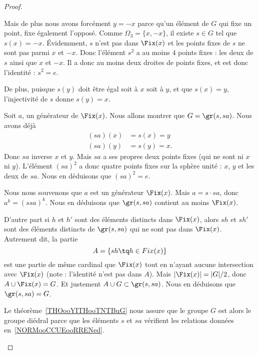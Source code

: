 \begin{proof}
\begin{subproof}
		Mais de plus nous avons forcément \( y=-x\) parce qu'un élément de \( G\) qui fixe un point, fixe également l'opposé. Comme \( \Omega_3=\{ x,-x \}\), il existe \( s\in G\) tel que \( s(x)=-x\). Évidemment, \( s\) n'est pas dans \( \Fix(x)\) et les points fixes de \( s\) ne sont pas parmi \( x\) et \( -x\). Donc l'élément \( s^2\) a au moins \( 4\) points fixes : les deux de \( s\) ainsi que \( x\) et \( -x\). Il a donc au moins deux droites de points fixes, et est donc l'identité : \( s^2=e\).

		De plus, puisque \( s(y)\) doit être égal soit à \( x\) soit à \( y\), et que \( s(x)=y\), l'injectivité de \( s\) donne \( s(y)=x\).

		Soit \( a\), un générateur de \( \Fix(x)\). Nous allons montrer que \( G=\gr(s,sa)\). Nous avons déjà
		\begin{subequations}
			\begin{align}
				(sa)(x) & =s(x)=y \\
				(sa)(y) & =s(y)=x.
			\end{align}
		\end{subequations}
		Donc \( sa\) inverse \( x\) et \( y\). Mais \( sa\) a ses propres deux points fixes (qui ne sont ni \( x\) ni \( y\)). L'élément \( (sa)^2\) a donc quatre points fixes sur la sphère unité : \( x\), \( y\) et les deux de \( sa\). Nous en déduisons que \( (sa)^2=e\).

		Nous nous souvenons que \( a\) est un générateur \( \Fix(x)\). Mais \( a=s\cdot sa\), donc \( a^k=(ssa)^k\). Nous en déduisons que \( \gr(s,sa)\) contient au moins \( \Fix(x)\).

		D'autre part si \( h\) et \( h'\) sont des éléments distincts dans \( \Fix(x)\), alors \( sh\) et \( sh'\) sont des éléments distincts de \( \gr(s,sa)\) qui ne sont pas dans \( \Fix(x)\). Autrement dit, la partie
		\begin{equation}
			A=\{ sh\tq h\in Fix(x) \}
		\end{equation}
		est une partie de même cardinal que \( \Fix(x)\) tout en n'ayant aucune intersection avec \( \Fix(x)\) (note : l'identité n'est pas dans \( A\)). Mais \( | \Fix(x) |=| G |/2\), donc \( A\cup\Fix(x)=G\). Et justement \( A\cup G\subset \gr(s,sa)\). Nous en déduisons que \( \gr(s,sa)=G\).

		Le théorème~\ref{THOooYITHooTNTBuG} nous assure que le groupe \( G\) est alors le groupe diédral parce que les éléments \( s\) et \( sa\) vérifient les relations données en~\ref{NORMooCCUEooRRENed}.


\end{subproof}
\end{proof}
